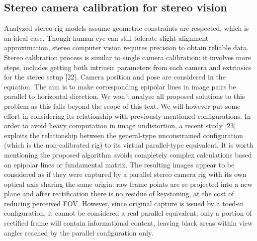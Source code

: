 \subsection{Stereo camera calibration for stereo vision}
Analyzed stereo rig models assume geometric constraints are respected, which is an ideal case. Though human eye can still tolerate slight alignment approximation, stereo computer vision requires precision to obtain reliable data. Stereo calibration process is similar to single camera calibration: it involves more steps, includes getting both intrinsic parameters from each camera and extrinsics for the stereo setup [22]. Camera position and pose are considered in the equation. The aim is to make corresponding epipolar lines in image pairs be parallel to horizontal direction. We won't analyse all proposed solutions to this problem as this falls beyond the scope of this text. We will however put some effort in considering its relationship with previously mentioned configurations. In order to avoid heavy computation in image undistortion, a recent study [23] exploits the relationship between the general-type unconstrained configuration (which is the non-calibrated rig) to its virtual parallel-type equivalent. It is worth mentioning the proposed algorithm avoids completely complex calculations based on epipolar lines or fundamental matrix. The resulting images appear to be considered as if they were captured by a parallel stereo camera rig with its own optical axis sharing the same origin: raw frame points are re-projected into a new plane and after rectification there is no residue of keystoning, at the cost of reducing perceived FOV. However, since original capture is issued by a toed-in configuration, it cannot be considered a real parallel equivalent; only a portion of rectified frame will contain informational content, leaving black areas within view angles reached by the parallel configuration only.

